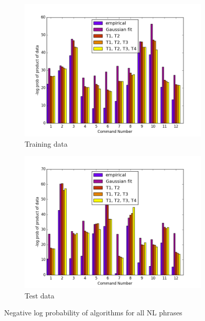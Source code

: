\documentclass[12pt,letterpaper]{article}
\begin{document}
\begin{figure}[H]
\centering
\begin{subfigure}{.45\textwidth}
  \centering
  \includegraphics[width=1.1\textwidth]{images/logprob_training.png}
  \caption{Training data}
  \label{fig:sub1}
\end{subfigure}%
\begin{subfigure}{.45\textwidth}
  \centering
  \includegraphics[width=1.1\textwidth]{images/logprob_test.png}
  \caption{Test data}
  \label{fig:sub2}
\end{subfigure}
\caption{Negative log probability of algorithms for all NL phrases}
\label{fig:logprob}
\end{figure}
\end{document}
